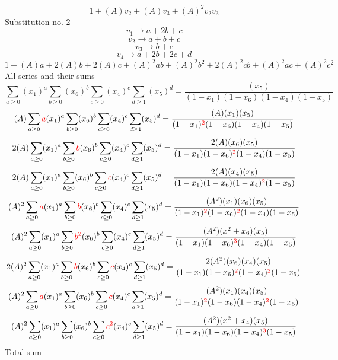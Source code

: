 \documentclass{article}
\begin{document}
\[1+(A)v_2+(A)v_3+(A)^2v_2v_3\]Substitution no. 2\[v_1\rightarrow{a+2b+c}\]\[v_2\rightarrow{a+b+c}\]\[v_3\rightarrow{b+c}\]\[v_4\rightarrow{a+2b+2c+d}\]\[1+(A)a+2(A)b+2(A)c+(A)^2ab+(A)^2b^{2}+2(A)^2cb+(A)^2ac+(A)^2c^{2}\]All series and their sums\[\sum_{a\geq{0}}(x_1)^{a}\sum_{b\geq{0}}(x_6)^{b}\sum_{c\geq{0}}(x_4)^{c}\sum_{d\geq{1}}(x_5)^{d}=\frac{(x_5)}{(1-x_1)(1-x_6)(1-x_4)(1-x_5)}\]\[(A)\sum_{a\geq{0}}\textcolor{red}{a}(x_1)^{a}\sum_{b\geq{0}}(x_6)^{b}\sum_{c\geq{0}}(x_4)^{c}\sum_{d\geq{1}}(x_5)^{d}=\frac{(A)(x_1)(x_5)}{(1-x_1)^{\textcolor{red}{2}}(1-x_6)(1-x_4)(1-x_5)}\]\[2(A)\sum_{a\geq{0}}(x_1)^{a}\sum_{b\geq{0}}\textcolor{red}{b}(x_6)^{b}\sum_{c\geq{0}}(x_4)^{c}\sum_{d\geq{1}}(x_5)^{d}=\frac{2(A)(x_6)(x_5)}{(1-x_1)(1-x_6)^{\textcolor{red}{2}}(1-x_4)(1-x_5)}\]\[2(A)\sum_{a\geq{0}}(x_1)^{a}\sum_{b\geq{0}}(x_6)^{b}\sum_{c\geq{0}}\textcolor{red}{c}(x_4)^{c}\sum_{d\geq{1}}(x_5)^{d}=\frac{2(A)(x_4)(x_5)}{(1-x_1)(1-x_6)(1-x_4)^{\textcolor{red}{2}}(1-x_5)}\]\[(A)^{2}\sum_{a\geq{0}}\textcolor{red}{a}(x_1)^{a}\sum_{b\geq{0}}\textcolor{red}{b}(x_6)^{b}\sum_{c\geq{0}}(x_4)^{c}\sum_{d\geq{1}}(x_5)^{d}=\frac{(A^{2})(x_1)(x_6)(x_5)}{(1-x_1)^{\textcolor{red}{2}}(1-x_6)^{\textcolor{red}{2}}(1-x_4)(1-x_5)}\]\[(A)^{2}\sum_{a\geq{0}}(x_1)^{a}\sum_{b\geq{0}}\textcolor{red}{b^{2}}(x_6)^{b}\sum_{c\geq{0}}(x_4)^{c}\sum_{d\geq{1}}(x_5)^{d}=\frac{(A^{2})(x^{2}+x_6)(x_5)}{(1-x_1)(1-x_6)^{\textcolor{red}{3}}(1-x_4)(1-x_5)}\]\[2(A)^{2}\sum_{a\geq{0}}(x_1)^{a}\sum_{b\geq{0}}\textcolor{red}{b}(x_6)^{b}\sum_{c\geq{0}}\textcolor{red}{c}(x_4)^{c}\sum_{d\geq{1}}(x_5)^{d}=\frac{2(A^{2})(x_6)(x_4)(x_5)}{(1-x_1)(1-x_6)^{\textcolor{red}{2}}(1-x_4)^{\textcolor{red}{2}}(1-x_5)}\]\[(A)^{2}\sum_{a\geq{0}}\textcolor{red}{a}(x_1)^{a}\sum_{b\geq{0}}(x_6)^{b}\sum_{c\geq{0}}\textcolor{red}{c}(x_4)^{c}\sum_{d\geq{1}}(x_5)^{d}=\frac{(A^{2})(x_1)(x_4)(x_5)}{(1-x_1)^{\textcolor{red}{2}}(1-x_6)(1-x_4)^{\textcolor{red}{2}}(1-x_5)}\]\[(A)^{2}\sum_{a\geq{0}}(x_1)^{a}\sum_{b\geq{0}}(x_6)^{b}\sum_{c\geq{0}}\textcolor{red}{c^{2}}(x_4)^{c}\sum_{d\geq{1}}(x_5)^{d}=\frac{(A^{2})(x^{2}+x_4)(x_5)}{(1-x_1)(1-x_6)(1-x_4)^{\textcolor{red}{3}}(1-x_5)}\]
Total sum
\end{document}
